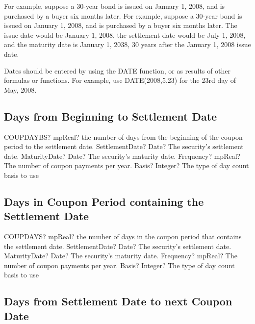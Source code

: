 \vspace{0.3cm}
For example, suppose a 30-year bond is issued on January 1, 2008, and is purchased by a buyer six months later. For example, suppose a 30-year bond is issued on January 1, 2008, and is purchased by a buyer six months later. The issue date would be January 1, 2008, the settlement date would be July 1, 2008, and the maturity date is January 1, 2038, 30 years after the January 1, 2008 issue date. 

\vspace{0.3cm}
Dates should be entered by using the DATE function, or as results of other formulas or functions. For example, use DATE(2008,5,23) for the 23rd day of May, 2008. 




\subsection{Days from Beginning to Settlement Date}

\begin{mpFunctionsExtract}
	\mpWorksheetFunctionFourNotImplemented
	{COUPDAYBS? mpReal? the number of days from the beginning of the coupon period to the settlement date.}
	{SettlementDate? Date? The security's settlement date.}
	{MaturityDate? Date? The security's maturity date.}
	{Frequency? mpReal? The number of coupon payments per year.}
	{Basis? Integer?  The type of day count basis to use}
\end{mpFunctionsExtract}



\subsection{Days in Coupon Period containing the Settlement Date}

\begin{mpFunctionsExtract}
	\mpWorksheetFunctionFourNotImplemented
	{COUPDAYS? mpReal? the number of days in the coupon period that contains the settlement date.}
	{SettlementDate? Date? The security's settlement date.}
	{MaturityDate? Date? The security's maturity date.}
	{Frequency? mpReal? The number of coupon payments per year.}
	{Basis? Integer?  The type of day count basis to use}
\end{mpFunctionsExtract}



\subsection{Days from Settlement Date to next Coupon Date}

